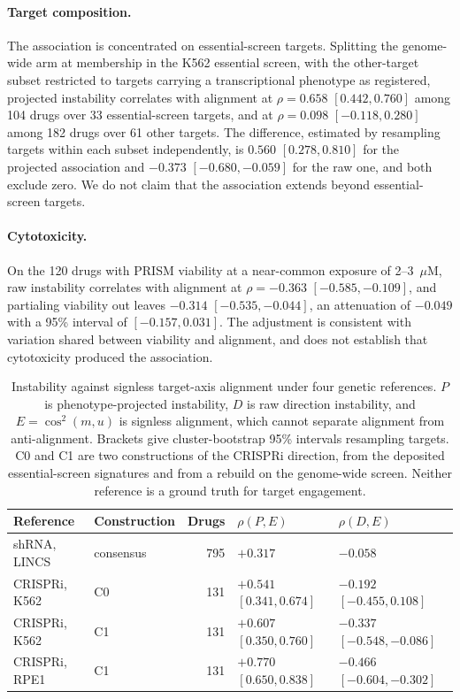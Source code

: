 \documentclass[11pt]{article}
\begin{document}
\paragraph{Target composition.} The association is concentrated on essential-screen
targets. Splitting the genome-wide arm at membership in the K562 essential screen,
with the other-target subset restricted to targets carrying a transcriptional
phenotype as registered, projected instability correlates with alignment at $\rho =
0.658$ $[0.442, 0.760]$ among 104 drugs over 33 essential-screen targets, and at
$\rho = 0.098$ $[-0.118, 0.280]$ among 182 drugs over 61 other targets. The
difference, estimated by resampling targets within each subset independently, is
$0.560$ $[0.278, 0.810]$ for the projected association and $-0.373$ $[-0.680,
-0.059]$ for the raw one, and both exclude zero. We do not claim that the
association extends beyond essential-screen targets.

\paragraph{Cytotoxicity.} On the 120 drugs with PRISM viability at a near-common
exposure of 2--3~$\mu$M, raw instability correlates with alignment at $\rho =
-0.363$ $[-0.585, -0.109]$, and partialing viability out leaves $-0.314$ $[-0.535,
-0.044]$, an attenuation of $-0.049$ with a 95\% interval of $[-0.157, 0.031]$. The
adjustment is consistent with variation shared between viability and alignment, and
does not establish that cytotoxicity produced the association.

\begin{table}[t]
\centering
\caption{Instability against signless target-axis alignment under four genetic
references. $P$ is phenotype-projected instability, $D$ is raw direction
instability, and $E = \cos^2(m, u)$ is signless alignment, which cannot separate
alignment from anti-alignment. Brackets give cluster-bootstrap 95\% intervals
resampling targets. C0 and C1 are two constructions of the CRISPRi direction, from
the deposited essential-screen signatures and from a rebuild on the genome-wide
screen. Neither reference is a ground truth for target engagement.}
\label{tab:references}
\small
\vspace{0.5\baselineskip}
\begin{tabular}{llrll}
\toprule
\textbf{Reference} & \textbf{Construction} & \textbf{Drugs} &
\textbf{$\rho(P, E)$} & \textbf{$\rho(D, E)$} \\
\midrule
shRNA, LINCS  & consensus & 795 & $+0.317$ & $-0.058$ \\
CRISPRi, K562 & C0 & 131 & $+0.541$ $[0.341, 0.674]$ & $-0.192$ $[-0.455, 0.108]$ \\
CRISPRi, K562 & C1 & 131 & $+0.607$ $[0.350, 0.760]$ & $-0.337$ $[-0.548, -0.086]$ \\
CRISPRi, RPE1 & C1 & 131 & $+0.770$ $[0.650, 0.838]$ & $-0.466$ $[-0.604, -0.302]$ \\
\bottomrule
\end{tabular}
\end{table}
\end{document}
